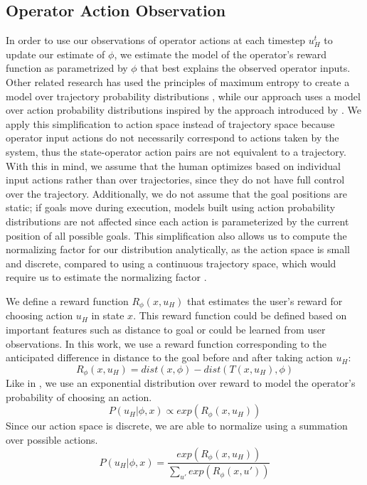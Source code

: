 \documentclass[conference]{IEEEtran}
\begin{document}
\subsection{Operator Action Observation}
In order to use our observations of operator actions at each timestep $u_H^t$ to update our estimate of $\phi$, we estimate the model of the operator's reward function as parametrized by $\phi$ that best explains the observed operator inputs. Other related research has used the principles of maximum entropy \cite{ziebart2008maximum} to create a model over trajectory probability distributions \cite{dragan2012formalizing, javdani2015shared}, while our approach uses a model over action probability distributions inspired by the approach introduced by  \citet{ramachandran2007bayesian}. We apply this simplification to action space instead of trajectory space because operator input actions do not necessarily correspond to actions taken by the system, thus the state-operator action pairs are not equivalent to a trajectory. With this in mind, we assume that the human optimizes based on individual input actions rather than over trajectories, since they do not have full control over the trajectory. Additionally, we do not assume that the goal positions are static; if goals move during execution, models built using action probability distributions are not affected since each action is parameterized by the current position of all possible goals. This simplification also allows us to compute the normalizing factor for our distribution analytically, as the action space is small and discrete, compared to using a continuous trajectory space, which would require us to estimate the normalizing factor \cite{javdani2015shared}.

We define a reward function $R_\phi (x, u_H)$ that estimates the user's reward for choosing action $u_H$ in state $x$. This reward function could be defined based on important features such as distance to goal or could be learned from user observations. In this work, we use a reward function corresponding to the anticipated difference in distance to the goal before and after taking action $u_H$: 
\[
R_\phi (x, u_H) = dist(x, \phi) - dist(T(x, u_H), \phi)
\]
Like in \cite{ramachandran2007bayesian}, we use an exponential distribution over reward to model the operator's probability of choosing an action.
\[
P(u_H|\phi, x) \propto exp(R_\phi (x, u_H))
\]
Since our action space is discrete, we are able to normalize using a summation over possible actions.
\[
P(u_H|\phi, x) = \frac{exp(R_\phi (x, u_H))}{\sum_{u'} exp(R_\phi (x, u'))}
\]
\end{document}
